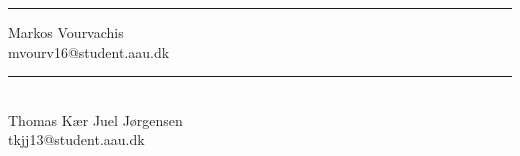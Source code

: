 \begin{minipage}[b]{0.45\textwidth}
 \centering
 \rule{\textwidth}{0.5pt}
   Markos Vourvachis\\
 {\footnotesize mvourv16@student.aau.dk}
\end{minipage}
\vspace{1.5\baselineskip}
\hfill
\begin{minipage}[b]{0.45\textwidth}
 \centering
 \rule{\textwidth}{0.45pt}\\
   Thomas Kær Juel Jørgensen\\
 {\footnotesize tkjj13@student.aau.dk}
\end{minipage}

